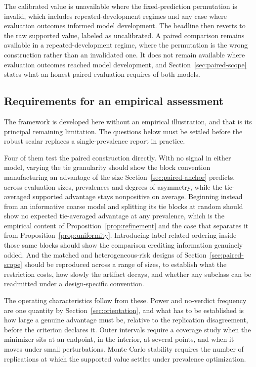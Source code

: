 \documentclass[11pt]{article}
\theoremstyle{remark}
\begin{document}
The calibrated value is unavailable where the fixed-prediction permutation is invalid, which includes repeated-development regimes and any case where evaluation outcomes informed model development. The headline then reverts to the raw supported value, labeled as uncalibrated. A paired comparison remains available in a repeated-development regime, where the permutation is the wrong construction rather than an invalidated one. It does not remain available where evaluation outcomes reached model development, and Section~\ref{sec:paired-scope} states what an honest paired evaluation requires of both models.


\subsection{Requirements for an empirical assessment}

The framework is developed here without an empirical illustration, and that is its principal remaining limitation. The questions below must be settled before the robust scalar replaces a single-prevalence report in practice.

Four of them test the paired construction directly. With no signal in either model, varying the tie granularity should show the block convention manufacturing an advantage of the size Section~\ref{sec:paired-anchor} predicts, across evaluation sizes, prevalences and degrees of asymmetry, while the tie-averaged supported advantage stays nonpositive on average. Beginning instead from an informative coarse model and splitting its tie blocks at random should show no expected tie-averaged advantage at any prevalence, which is the empirical content of Proposition~\ref{prop:refinement} and the case that separates it from Proposition~\ref{prop:uniformity}. Introducing label-related ordering inside those same blocks should show the comparison crediting information genuinely added. And the matched and heterogeneous-risk designs of Section~\ref{sec:paired-scope} should be reproduced across a range of sizes, to establish what the restriction costs, how slowly the artifact decays, and whether any subclass can be readmitted under a design-specific convention.

The operating characteristics follow from these. Power and no-verdict frequency are one quantity by Section~\ref{sec:orientation}, and what has to be established is how large a genuine advantage must be, relative to the replication disagreement, before the criterion declares it. Outer intervals require a coverage study when the minimizer sits at an endpoint, in the interior, at several points, and when it moves under small perturbations. Monte Carlo stability requires the number of replications at which the supported value settles under prevalence optimization.
\end{document}
